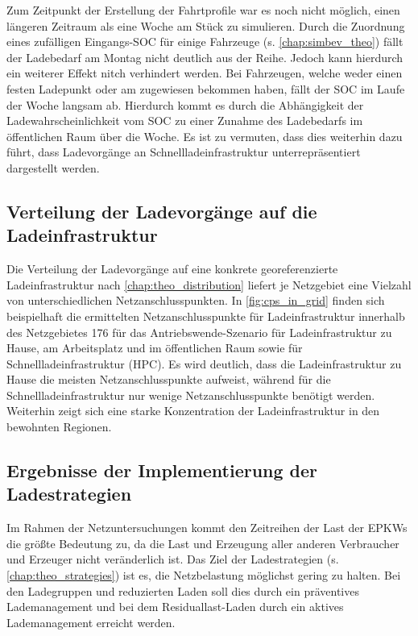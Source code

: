 
Zum Zeitpunkt der Erstellung der Fahrtprofile war es noch nicht möglich, einen längeren Zeitraum als eine Woche am Stück zu simulieren.
Durch die Zuordnung eines zufälligen Eingangs-\gls{SOC} für einige Fahrzeuge (s. \autoref{chap:simbev_theo}) fällt der Ladebedarf am Montag nicht deutlich aus der Reihe.
Jedoch kann hierdurch ein weiterer Effekt nitch verhindert werden.
Bei Fahrzeugen, welche weder einen festen Ladepunkt \zH oder am \Firmeparkplatz zugewiesen bekommen haben, fällt der \gls{SOC} im Laufe der Woche langsam ab.
Hierdurch kommt es durch die Abhängigkeit der Ladewahrscheinlichkeit vom \gls{SOC} zu einer Zunahme des Ladebedarfs im öffentlichen Raum über die Woche.
Es ist zu vermuten, dass dies weiterhin dazu führt, dass Ladevorgänge an Schnellladeinfrastruktur un­ter­re­prä­sen­tiert dargestellt werden.


\subsection{Verteilung der Ladevorgänge auf die Ladeinfrastruktur}\label{chap:distribute_demand_ev}

Die Verteilung der Ladevorgänge auf eine konkrete georeferenzierte Ladeinfrastruktur nach \autoref{chap:theo_distribution} liefert je Netzgebiet eine Vielzahl von unterschiedlichen Netzanschlusspunkten.
In \autoref{fig:cps_in_grid} finden sich beispielhaft die ermittelten Netzanschlusspunkte für Ladeinfrastruktur innerhalb des Netzgebietes \num{176} für das Antriebswende-Szenario für Ladeinfrastruktur zu Hause, am Arbeitsplatz und im öffentlichen Raum sowie für Schnellladeinfrastruktur (\gls{HPC}).
Es wird deutlich, dass die Ladeinfrastruktur zu Hause die meisten Netzanschlusspunkte aufweist, während für die Schnellladeinfrastruktur nur wenige Netzanschlusspunkte benötigt werden.
Weiterhin zeigt sich eine starke Konzentration der Ladeinfrastruktur in den bewohnten Regionen.




\subsection{Ergebnisse der Implementierung der Ladestrategien}\label{chap:results_charging_strategies}

Im Rahmen der Netzuntersuchungen kommt den Zeitreihen der Last der \glspl{EPKW} die größte Bedeutung zu, da die Last und Erzeugung aller anderen Verbraucher und Erzeuger nicht veränderlich ist.
Das Ziel der Ladestrategien (s. \autoref{chap:theo_strategies}) ist es, die Netzbelastung möglichst gering zu halten.
Bei den Ladegruppen und reduzierten Laden soll dies durch ein präventives Lademanagement und bei dem Residuallast-Laden durch ein aktives Lademanagement erreicht werden.

